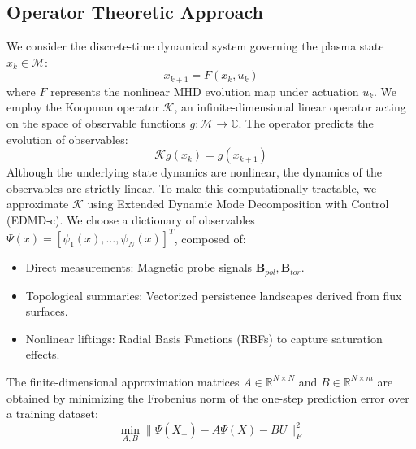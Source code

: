 \documentclass{article}
\begin{document}
\subsection{Operator Theoretic Approach}
We consider the discrete-time dynamical system governing the plasma state $x_k \in \mathcal{M}$:
\begin{equation}
    x_{k+1} = F(x_k, u_k)
\end{equation}
where $F$ represents the nonlinear MHD evolution map under actuation $u_k$. We employ the Koopman operator $\mathcal{K}$, an infinite-dimensional linear operator acting on the space of observable functions $g: \mathcal{M} \to \mathbb{C}$. The operator predicts the evolution of observables:
\begin{equation}
 \mathcal{K} g(x_k) = g(x_{k+1})
\end{equation}
Although the underlying state dynamics are nonlinear, the dynamics of the observables are strictly linear. To make this computationally tractable, we approximate $\mathcal{K}$ using Extended Dynamic Mode Decomposition with Control (EDMD-c). We choose a dictionary of observables $\Psi(x) = [\psi_1(x), \dots, \psi_N(x)]^T$, composed of:
\begin{itemize}
    \item Direct measurements: Magnetic probe signals $\mathbf{B}_{pol}, \mathbf{B}_{tor}$.
    \item Topological summaries: Vectorized persistence landscapes derived from flux surfaces.
    \item Nonlinear liftings: Radial Basis Functions (RBFs) to capture saturation effects.
\end{itemize}
The finite-dimensional approximation matrices $A \in \mathbb{R}^{N \times N}$ and $B \in \mathbb{R}^{N \times m}$ are obtained by minimizing the Frobenius norm of the one-step prediction error over a training dataset:
\begin{equation}
    \min_{A, B} \| \Psi(X_+) - A \Psi(X) - B U \|_F^2
\end{equation}
\end{document}
